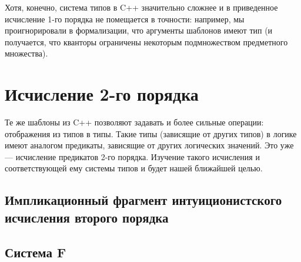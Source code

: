 Хотя, конечно, система типов в C++ значительно сложнее и в приведенное исчисление 1-го порядка
не помещается в точности: например, мы проигнорировали в формализации, что аргументы шаблонов 
имеют тип (и получается, что кванторы ограничены некоторым подмножеством предметного множества).

\section{Исчисление 2-го порядка}

Те же шаблоны из C++ позволяют задавать и более сильные операции: отображения из типов в типы.
Такие типы (зависящие от других типов) в логике имеют аналогом предикаты, зависящие от других
логических значений. Это уже --- исчисление предикатов 2-го порядка.
Изучение такого исчисления и соответствующей ему системы типов и будет нашей ближайшей целью.

\subsection{Импликационный фрагмент интуиционистского исчисления второго порядка}

\subsection{Система F}

\begin{definition}
\end{definition}

